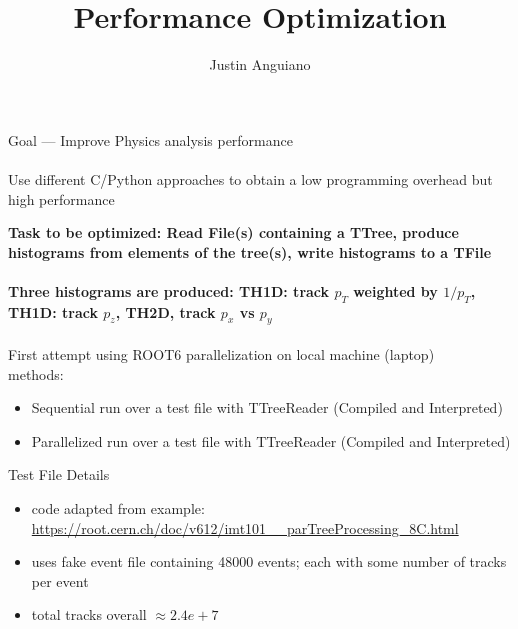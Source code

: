 \documentclass[10pt]{beamer}
\author{Justin Anguiano}
\title{Performance Optimization}
\begin{document}
\begin{frame}
\titlepage
\end{frame}


\begin{frame}{}
Goal --- Improve Physics analysis performance \\
\quad \quad \\
Use different C/Python approaches to obtain a low programming overhead but high performance\\ 
\end{frame}

\begin{frame}
\textbf{Task to be optimized: Read File(s) containing a TTree, produce histograms from elements of the tree(s), write histograms to a TFile}\\
\quad \quad \\
\scriptsize
\textbf{ Three histograms are produced: TH1D: track $p_{T}$ weighted by $1/p_{T}$, TH1D: track $p_z$, TH2D, track $p_x$ vs $p_y$} \\
\normalsize
\quad \quad \\
First attempt using ROOT6 parallelization on local machine (laptop)\\
methods:\\
\begin{itemize}
\item Sequential run over a test file with TTreeReader (Compiled and Interpreted)
\item Parallelized run over a test file with TTreeReader (Compiled and Interpreted)
\end{itemize}

Test File Details\\
\begin{itemize}
\item code adapted from example: \url{https://root.cern.ch/doc/v612/imt101__parTreeProcessing_8C.html} 
\item uses fake event file containing 48000 events; each with some number of tracks per event
\item total tracks overall $\approx 2.4e+7$ 
\end{itemize}

\end{frame}
\end{document}
